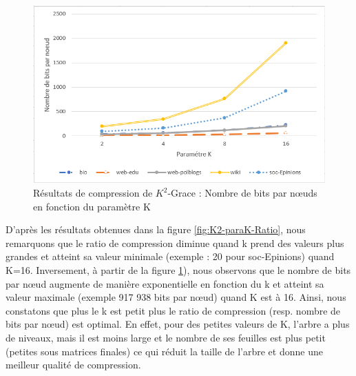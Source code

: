 \begin{figure}[H]
	\centering
	\includegraphics[scale=0.9]{ressources/image/Tests/K2-paraK-NBbits.png}
	
	\caption{Résultats de compression de $K^2$-Grace : Nombre de bits par nœuds en fonction du paramètre K}
	\label{fig:K2-paraK-NBbits}
\end{figure}		



D'après les résultats obtenues dans la figure \ref{fig:K2-paraK-Ratio}, nous remarquons que le ratio de compression diminue quand k prend des valeurs plus grandes et atteint sa valeur minimale (exemple : 20 pour soc-Epinions) quand K=16. Inversement, à partir de la figure \ref{fig:K2-paraK-NBbits}), nous observons que le nombre de bits par nœud augmente de manière exponentielle en fonction du k et atteint sa valeur maximale (exemple 917 938 bits par nœud) quand K est à 16. Ainsi, nous constatons que plus le k est petit plus le ratio de compression (resp. nombre de bits par nœud) est optimal. En effet, pour des petites valeurs de K, l'arbre a plus de niveaux, mais il est moins large et le nombre de ses feuilles est plus petit (petites sous matrices finales) ce qui réduit la taille de l'arbre et donne une meilleur qualité de compression. %


